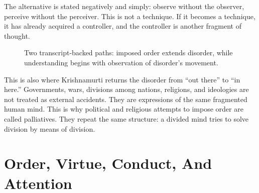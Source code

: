 The alternative is stated negatively and simply: observe without the observer, perceive without the perceiver. This is not a technique. If it becomes a technique, it has already acquired a controller, and the controller is another fragment of thought.

\begin{figure}
\centering
{}

Two transcript-backed paths: imposed order extends disorder, while understanding begins with observation of disorder's movement.
\end{figure}

This is also where Krishnamurti returns the disorder from ``out there'' to ``in here.'' Governments, wars, divisions among nations, religions, and ideologies are not treated as external accidents. They are expressions of the same fragmented human mind. This is why political and religious attempts to impose order are called palliatives. They repeat the same structure: a divided mind tries to solve division by means of division.

\section{Order, Virtue, Conduct, And Attention}


